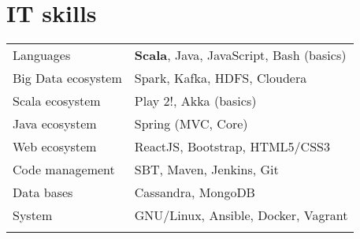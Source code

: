 \documentclass[11pt,a4paper]{moderncv}
\begin{document}
\section{IT skills}
\begin{tabular}{ll}
  \vspace{0.1cm}
  \hspace{0.1cm} Languages & \hspace{0.5cm} \textbf{Scala}, Java, JavaScript, Bash (basics) \\ \vspace{0.1cm}
  \hspace{0.1cm} Big Data ecosystem & \hspace{0.5cm} Spark, Kafka, HDFS, Cloudera \\ \vspace{0.1cm}
  \hspace{0.1cm} Scala ecosystem & \hspace{0.5cm} Play 2!, Akka (basics) \\ \vspace{0.1cm}
  \hspace{0.1cm} Java ecosystem & \hspace{0.5cm} Spring (MVC, Core) \\ \vspace{0.1cm}
  \hspace{0.1cm} Web ecosystem & \hspace{0.5cm} ReactJS, Bootstrap, HTML5/CSS3 \\ \vspace{0.1cm}
  \hspace{0.1cm} Code management & \hspace{0.5cm} SBT, Maven, Jenkins, Git \\ \vspace{0.1cm}
  \hspace{0.1cm} Data bases & \hspace{0.5cm} Cassandra, MongoDB \\ \vspace{0.1cm}
  \hspace{0.1cm} System & \hspace{0.5cm} GNU/Linux, Ansible, Docker, Vagrant \\ \vspace{0.1cm}
\end{tabular}



\newpage
\end{document}
